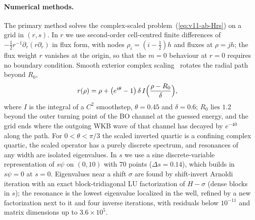 \paragraph{Numerical methods.}
The primary method solves the complex-scaled problem~(\ref{eq:v11-ab-Hrs}) on a grid in $(r,s)$.
In $r$ we use second-order cell-centred finite differences of $-\frac12r^{-1}\partial_r(r\partial_r)$ in flux form, with nodes $\rho_i=(i-\frac12)h$ and fluxes at $\rho=jh$; the flux weight $r$ vanishes at the origin, so that the $m=0$ behaviour at $r=0$ requires no boundary condition.
Smooth exterior complex scaling~\cite{Simon:1979ecs} rotates the radial path beyond $R_0$,
\begin{equation}
r(\rho)=\rho+\bigl(e^{i\theta}-1\bigr)\,\delta\,I\Bigl(\frac{\rho-R_0}{\delta}\Bigr),
\label{eq:v11-ab-ecs}
\end{equation}
where $I$ is the integral of a $C^2$ smoothstep, $\theta=0.45$ and $\delta=0.6$; $R_0$ lies $1.2$ beyond the outer turning point of the BO channel at the guessed energy, and the grid ends where the outgoing WKB wave of that channel has decayed by $e^{-40}$ along the path. %
For $0<\theta<\pi/3$ the scaled inverted quartic is a confining complex quartic, the scaled operator has a purely discrete spectrum, and resonances of any width are isolated eigenvalues.
In $s$ we use a sine discrete-variable representation of $s\psi$ on $(0,10)$ with $70$ points ($\Delta s=0.14$), which builds in $s\psi=0$ at $s=0$. %
Eigenvalues near a shift $\sigma$ are found by shift-invert Arnoldi iteration with an exact block-tridiagonal LU factorization of $H-\sigma$ (dense blocks in $s$); the resonance is the lowest eigenvalue localized in the well, refined by a new factorization next to it and four inverse iterations, with residuals below $10^{-11}$ and matrix dimensions up to $3.6\times10^5$. %

